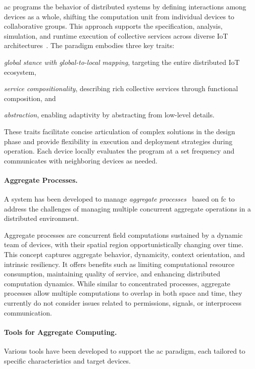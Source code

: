 \documentclass[12pt, a4paper]{article}
\newenvironment{inlinelist}{\begin{enumerate*}[label=\emph{(\roman*)}]}{\end{enumerate*}}
\begin{document}
\ac{ac} programs the behavior of distributed systems by defining interactions among devices as a whole,
shifting the computation unit from individual devices to collaborative groups.
%
This approach supports the specification, analysis, simulation,
and runtime execution of collective services across diverse IoT architectures~\cite{FI2020-pulverization}.
%
The paradigm embodies three key traits:
\begin{inlinelist}
    \item \emph{global stance with global-to-local mapping}, targeting the entire distributed IoT ecosystem,
    \item \emph{service compositionality}, describing rich collective services through functional composition, and
    \item \emph{abstraction}, enabling adaptivity by abstracting from low-level details.
\end{inlinelist}
%
These traits facilitate concise articulation of complex solutions in the design phase and provide flexibility in execution and deployment strategies during operation.
%
Each device locally evaluates the program at a set frequency and communicates with neighboring devices as needed.

\sloppypar
\paragraph{Aggregate Processes.}
\label{par:aggregate-processes}

A system has been developed to manage \emph{aggregate processes}~\cite{aggregate-processes} based on \ac{fc}
to address the challenges of managing multiple concurrent aggregate operations in a distributed environment.

Aggregate processes are concurrent field computations sustained by a dynamic team of devices,
with their spatial region opportunistically changing over time.
%
This concept captures aggregate behavior, dynamicity, context orientation, and intrinsic resiliency.
%
It offers benefits such as limiting computational resource consumption, maintaining quality of service,
and enhancing distributed computation dynamics.
%
While similar to concentrated processes,
aggregate processes allow multiple computations to overlap in both space and time,
they currently do not consider issues related to permissions, signals, or interprocess communication.

\sloppypar
\paragraph{Tools for Aggregate Computing.}
Various tools have been developed to support the \ac{ac} paradigm,
each tailored to specific characteristics and target devices.
\end{document}
